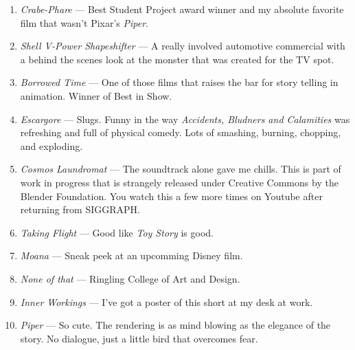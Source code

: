 \documentclass[../main.tex]{subfiles}
\begin{document}
\begin{enumerate}
	\item \textit{Crabe-Phare} --- Best Student Project award winner and my absolute favorite film that wasn't Pixar's \textit{Piper}.
	\item \textit{Shell V-Power Shapeshifter} --- A really involved automotive commercial with a behind the scenes look at the monster that was created for the TV spot.
	\item \textit{Borrowed Time} --- One of those films that raises the bar for story telling in animation. Winner of Best in Show.
	\item \textit{Escargore} --- Slugs. Funny in the way \textit{Accidents, Bludners and Calamities} was refreshing and full of physical comedy. Lots of smashing, burning, chopping, and exploding.
	\item \textit{Cosmos Laundromat} --- The soundtrack alone gave me chills. This is part of work in progress that is strangely released under Creative Commons by the Blender Foundation. You watch this a few more times on Youtube after returning from SIGGRAPH.
	\item \textit{Taking Flight} --- Good like \textit{Toy Story} is good.
	\item \textit{Moana} --- Sneak peek at an upcomming Disney film.
	\item \textit{None of that} --- Ringling College of Art and Design.
	\item \textit{Inner Workings} --- I've got a poster of this short at my desk at work.
	\item \textit{Piper} --- So cute. The rendering is as mind blowing as the elegance of the story. No dialogue, just a little bird that overcomes fear.
\end{enumerate}
\end{document}
